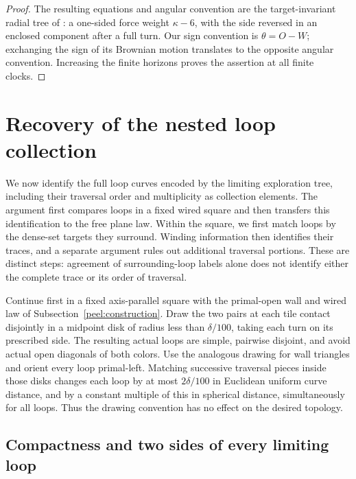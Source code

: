\begin{proof}
The resulting equations and angular convention are the target-invariant
radial tree of
\citet[Propositions~3.13--3.14 and Section~4.2]{Sheffield2009Exploration}:
a one-sided force weight $\kappa-6$, with the side reversed in an
enclosed component after a full turn.  Our sign convention is
$\theta=O-W$; exchanging the sign of its Brownian motion translates
to the opposite angular convention.  Increasing the finite horizons
proves the assertion at all finite clocks.
\end{proof}

\section{Recovery of the nested loop collection}
\label{sec:loops}

We now identify the full loop curves encoded by the limiting
exploration tree, including their traversal order and multiplicity as
collection elements.  The argument first compares loops in a fixed
wired square and then transfers this identification to the free plane law.
Within the square, we first match loops by the dense-set targets they
surround.  Winding information then identifies their traces, and a
separate argument rules out additional traversal portions.  These are
distinct steps: agreement of surrounding-loop labels alone does not
identify either the complete trace or its order of traversal.

Continue first in a fixed axis-parallel square with the primal-open
wall and wired law of Subsection~\ref{peel:construction}.  Draw the two
pairs at each tile contact disjointly in a midpoint disk of radius
less than $\delta/100$, taking each turn on its prescribed side.
The resulting actual loops are simple, pairwise disjoint, and avoid
actual open diagonals of both colors.  Use the analogous drawing for
wall triangles and orient every loop primal-left.  Matching successive
traversal pieces inside those disks changes each loop by at most
$2\delta/100$ in Euclidean uniform curve distance, and by a constant
multiple of this in spherical distance, simultaneously for all loops.
Thus the drawing convention has no effect on the desired topology.

\subsection{Compactness and two sides of every limiting loop}
\label{loop:compactness}

